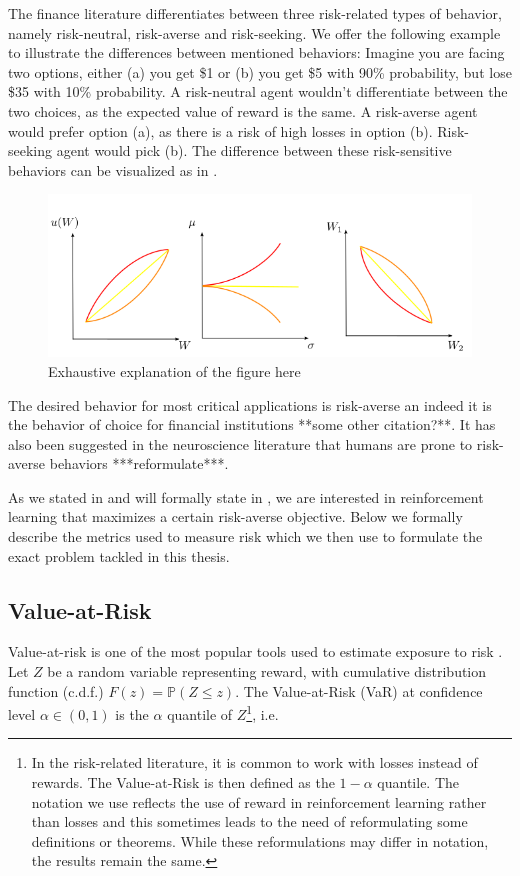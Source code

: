 The finance literature differentiates between three risk-related types of behavior, namely risk-neutral, risk-averse and risk-seeking. We offer the following example to illustrate the differences between mentioned behaviors: Imagine you are facing two options, either (a) you get \$1 or (b) you get \$5 with 90\% probability, but lose \$35 with 10\% probability. A risk-neutral agent wouldn't differentiate between the two choices, as the expected value of reward is the same. A risk-averse agent would prefer option (a), as there is a risk of high losses in option (b). Risk-seeking agent would pick (b). The difference between these risk-sensitive behaviors can be visualized as in .

\begin{figure}
\center
\includegraphics[width=\linewidth]{gfx/risk_behavior.png}
\caption{Exhaustive explanation of the figure here}
\label{fig:prelim:risk}
\end{figure}

The desired behavior for most critical applications is risk-averse an indeed it is the behavior of choice for financial institutions **some other citation?**\citep{basel2013fundamental}. It has also been suggested in the neuroscience literature that humans are prone to risk-averse behaviors ***reformulate***\citep{shen2014risk}.

As we stated in  and will formally state in , we are interested in reinforcement learning that maximizes a certain risk-averse objective. Below we formally describe the metrics used to measure risk which we then use to formulate the exact problem tackled in this thesis.


\subsection{Value-at-Risk}

Value-at-risk \citep{wipplinger2007philippe} is one of the most popular tools used to estimate exposure to risk .
Let $Z$ be a random variable representing reward, with cumulative distribution function (c.d.f.) $F(z) = \mathbb{P}(Z \le z)$.
The Value-at-Risk (VaR) at confidence level $\alpha \in (0,1)$ is the $\alpha$ quantile of $Z$\footnote{In the risk-related literature, it is common to work with losses instead of rewards. The Value-at-Risk is then defined as the $1-\alpha$ quantile. The notation we use reflects the use of reward in reinforcement learning rather than losses and this sometimes leads to the need of reformulating some definitions or theorems. While these reformulations may differ in notation, the results remain the same.}, i.e. 

